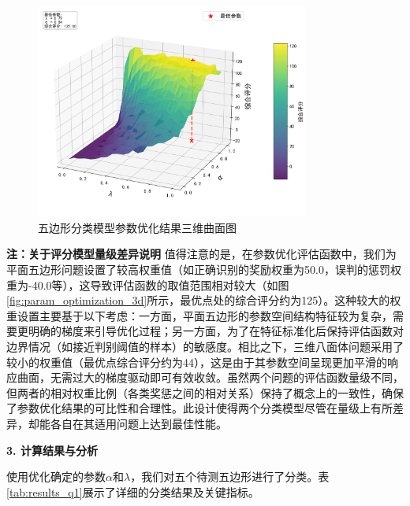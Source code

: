 \begin{figure}[H]
    \centering
    \includegraphics[width=0.8\textwidth]{figures/params/pentagon_parameter_optimization_3d.png}
    \caption{五边形分类模型参数优化结果三维曲面图}
    \label{fig:param_optimization_3d1}
\end{figure}

\textbf {注：关于评分模型量级差异说明} 值得注意的是，在参数优化评估函数中，我们为平面五边形问题设置了较高权重值（如正确识别的奖励权重为50.0，误判的惩罚权重为-40.0等），这导致评估函数的取值范围相对较大（如图\ref{fig:param_optimization_3d}所示，最优点处的综合评分约为125）。这种较大的权重设置主要基于以下考虑：一方面，平面五边形的参数空间结构特征较为复杂，需要更明确的梯度来引导优化过程；另一方面，为了在特征标准化后保持评估函数对边界情况（如接近判别阈值的样本）的敏感度。相比之下，三维八面体问题采用了较小的权重值（最优点综合评分约为44），这是由于其参数空间呈现更加平滑的响应曲面，无需过大的梯度驱动即可有效收敛。虽然两个问题的评估函数量级不同，但两者的相对权重比例（各类奖惩之间的相对关系）保持了概念上的一致性，确保了参数优化结果的可比性和合理性。此设计使得两个分类模型尽管在量级上有所差异，却能各自在其适用问题上达到最佳性能。
\label{bf:important_note}

\textbf{3. 计算结果与分析}
    
使用优化确定的参数$\alpha$和$\lambda$，我们对五个待测五边形进行了分类。表\ref{tab:results_q1}展示了详细的分类结果及关键指标。
    
